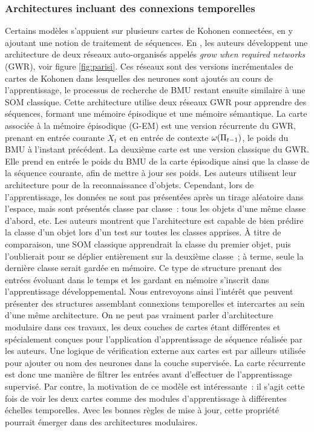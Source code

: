 \documentclass[../main]{subfiles}
\begin{document}
\subsubsection{Architectures incluant des connexions temporelles}

Certains modèles s'appuient sur plusieurs cartes de Kohonen connectées, en y ajoutant une notion de traitement de séquences.
En \cite{parisiLL}, les auteurs développent une architecture de deux réseaux auto-organisés appelés \emph{grow when required networks} (GWR), voir figure \ref{fig:parisi}. Ces réseaux sont des versions incrémentales de cartes de Kohonen dans lesquelles des neurones sont ajoutés au cours de l'apprentissage, le processus de recherche de BMU restant ensuite similaire à une SOM classique.
Cette architecture utilise deux réseaux GWR pour apprendre des séquences, formant une mémoire épisodique et une mémoire sémantique.
La carte associée à la mémoire épisodique (G-EM) est une version récurrente du GWR, prenant en entrée courante $X_t$ et en entrée de contexte $\omega(\Pi_{t-1})$, le poids du BMU à l'instant précédent.
La deuxième carte est une version classique du GWR. Elle prend en entrée le poids du BMU de la carte épisodique ainsi que la classe de la séquence courante, afin de mettre à jour ses poids.
Les auteurs utilisent leur architecture pour de la reconnaissance d'objets. Cependant, lors de l'apprentissage, les données ne sont pas présentées après un tirage aléatoire dans l'espace, mais sont présentés classe par classe~: tous les objets d'une même classe d'abord, etc. Les auteurs montrent que l'architecture est capable de bien prédire la classe d'un objet lors d'un test sur toutes les classes apprises. \`{A} titre de comparaison, une SOM classique apprendrait la classe du premier objet, puis l'oublierait pour se déplier entièrement sur la deuxième classe~; à terme, seule la dernière classe serait gardée en mémoire.
Ce type de structure prenant des entrées évoluant dans le temps et les gardant en mémoire s'inscrit dans l'apprentissage développemental. Nous entrevoyons ainsi l'intérêt que peuvent présenter des structures assemblant connexions temporelles et intercartes au sein d'une même architecture.
On ne peut pas vraiment parler d'architecture modulaire dans ces travaux, les deux couches de cartes étant différentes et spécialement conçues pour l'application d'apprentissage de séquence réalisée par les auteurs. Une logique de vérification externe aux cartes est par ailleurs utilisée pour ajouter ou nom des neurones dans la couche supervisée. La carte récurrente est donc une manière de filtrer les entrées avant d'effectuer de l'apprentissage supervisé.
Par contre, la motivation de ce modèle est intéressante~: il s'agit cette fois de voir les deux cartes comme des modules d'apprentissage à différentes échelles temporelles. Avec les bonnes règles de mise à jour, cette propriété pourrait émerger dans des architectures modulaires.
\end{document}
